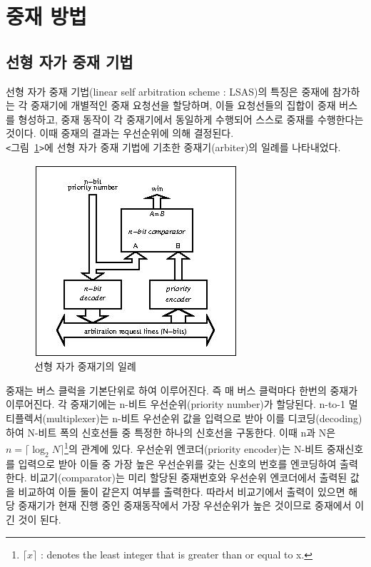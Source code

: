 \section{중재 방법}
\subsection{선형 자가 중재 기법}
선형 자가 중재 기법(linear self arbitration scheme : LSAS)의 특징은
중재에 참가하는 각 중재기에 개별적인 중재 요청선을 할당하며,
이들 요청선들의 집합이 중재 버스를 형성하고,
중재 동작이 각 중재기에서 동일하게 수행되어 스스로 중재를 수행한다는 것이다.
이때 중재의 결과는 우선순위에 의해 결정된다. \\
{\tt <}그림~\ref{figure:arbiter}{\tt >}에 선형 자가 중재 기법에
기초한 중재기(arbiter)의 일례를 나타내었다.
\begin{figure}[htb]
   \centerline{\includegraphics{ch2/FIG/arbiter.jpg}} %
   \caption{선형 자가 중재기의 일례}\label{figure:arbiter}
\end{figure}
중재는 버스 클럭을 기본단위로 하여 이루어진다. 즉 매 버스 클럭마다 한번의 중재가 이루어진다.
각 중재기에는 n-비트 우선순위(priority number)가 할당된다.
n-to-1 멀티플렉서(multiplexer)는 n-비트 우선순위 값을 입력으로 받아
이를 디코딩(decoding)하여
N-비트 폭의 신호선들 중 특정한 하나의 신호선을 구동한다.
이때 n과 N은 $n = \lceil \log_{2} N \rceil$\footnote{$\lceil x \rceil$ :
denotes the least integer that is greater than or equal to x.}의 관계에 있다.
우선순위 엔코더(priority encoder)는 N-비트 중재신호를 입력으로 받아
이들 중 가장 높은 우선순위를 갖는 신호의 번호를 엔코딩하여 출력한다.
비교기(comparator)는 미리 할당된 중재번호와 우선순위 엔코더에서 출력된 값을
비교하여 이들 둘이 같은지 여부를 출력한다.
따라서 비교기에서 출력이 있으면 해당 중재기가 현재 진행 중인 중재동작에서 가장 우선순위가
높은 것이므로 중재에서 이긴 것이 된다.
%
